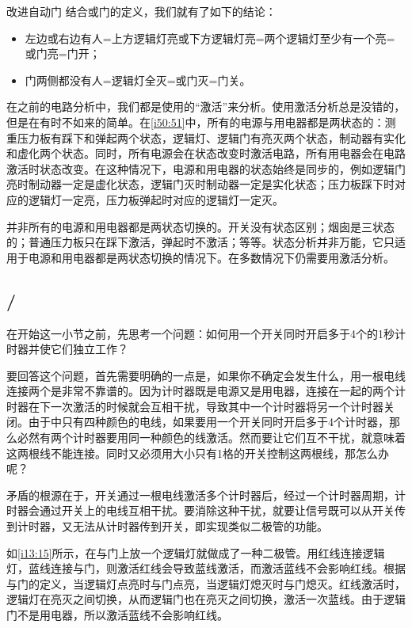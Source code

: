 \begin{example}{改进自动门}{}
  结合或门的定义，我们就有了如下的结论：
  \begin{itemize}
    \item 左边或右边有人=上方逻辑灯亮或下方逻辑灯亮=两个逻辑灯至少有一个亮=或门亮=门开；
    \item 门两侧都没有人=逻辑灯全灭=或门灭=门关。
  \end{itemize}

  在之前的电路分析中，我们都是使用的“激活”来分析。使用激活分析总是没错的，但是在有时不如来的简单。在\autoref{i50:51}中，所有的电源与用电器都是两状态的：测重压力板有踩下和弹起两个状态，逻辑灯、逻辑门有亮灭两个状态，制动器有实化和虚化两个状态。同时，所有电源会在状态改变时激活电路，所有用电器会在电路激活时状态改变。在这种情况下，电源和用电器的状态始终是同步的，例如逻辑门亮时制动器一定是虚化状态，逻辑门灭时制动器一定是实化状态；压力板踩下时对应的逻辑灯一定亮，压力板弹起时对应的逻辑灯一定灭。
  \begin{remark*}{}{}
    并非所有的电源和用电器都是两状态切换的。开关没有状态区别；烟囱是三状态的；普通压力板只在踩下激活，弹起时不激活；等等。状态分析并非万能，它只适用于电源和用电器都是两状态切换的情况下。在多数情况下仍需要用激活分析。
  \end{remark*}
\end{example}

\subsection{/}

在开始这一小节之前，先思考一个问题：如何用一个开关同时开启多于4个的1秒计时器并使它们独立工作？

要回答这个问题，首先需要明确的一点是，如果你不确定会发生什么，用一根电线连接两个是非常不靠谱的。因为计时器既是电源又是用电器，连接在一起的两个计时器在下一次激活的时候就会互相干扰，导致其中一个计时器将另一个计时器关闭。由于\termTR 中只有四种颜色的电线，如果要用一个开关同时开启多于4个计时器，那么必然有两个计时器要用同一种颜色的线激活。然而要让它们互不干扰，就意味着这两根线不能连接。同时又必须用大小只有1格的开关控制这两根线，那怎么办呢？

矛盾的根源在于，开关通过一根电线激活多个计时器后，经过一个计时器周期，计时器会通过开关上的电线互相干扰。要消除这种干扰，就要让信号既可以从开关传到计时器，又无法从计时器传到开关，即实现类似二极管的功能。

如\autoref{i13:15}所示，在与门上放一个逻辑灯就做成了一种二极管。用红线连接逻辑灯，蓝线连接与门，则激活红线会导致蓝线激活，而激活蓝线不会影响红线。根据与门的定义，当逻辑灯点亮时与门点亮，当逻辑灯熄灭时与门熄灭。红线激活时，逻辑灯在亮灭之间切换，从而逻辑门也在亮灭之间切换，激活一次蓝线。由于逻辑门不是用电器，所以激活蓝线不会影响红线。

